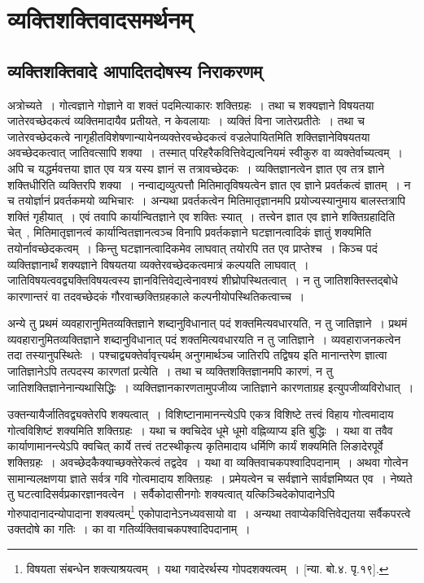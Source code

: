 	\section{व्यक्तिशक्तिवादसमर्थनम्}

		\subsection{व्यक्तिशक्तिवादे आपादितदोषस्य निराकरणम् }

			\begin{small}
				अत्रोच्यते~। गोत्वज्ञाने गोज्ञाने वा शक्तं पदमित्याकारः शक्तिग्रहः~। तथा च शक्यज्ञाने विषयतया जातेरवच्छेदकत्वं व्यक्तिमादायैव प्रतीयते, न केवलायाः~। व्यक्तिं विना जातेरप्रतीतेः~। तथा च जातेरवच्छेदकत्वे नागृहीतविशेषणान्यायेनव्यक्तेरवच्छेदकत्वं वज्रलेपायितमिति शक्तिज्ञानेविषयतया अवच्छेदकत्वात् जातिवत्सापि शक्या~। तस्मात् परिहरैकवित्तिवेद्यत्वनियमं स्वीकुरु वा व्यक्तेर्वाच्यत्वम्~। अपि च यद्धर्मवत्तया ज्ञात एव यत्र यस्य ज्ञानं स तत्रावच्छेदकः~। व्यक्तिज्ञानत्वेन ज्ञात एव तत्र ज्ञाने शक्तिधीरिति व्यक्तिरपि शक्या~। नन्वाद्यव्युत्पत्तौ मितिमातृविषयत्वेन ज्ञात एव ज्ञाने प्रवर्तकत्वं ज्ञातम्~। न च तयोर्ज्ञानं प्रवर्तकमयो व्यभिचारः~। अन्यथा प्रवर्तकत्वेन मितिमातृज्ञानमपि प्रयोज्यस्यानुमाय बालस्तत्रापि शक्तिं गृहीयात्~। एवं तवापि कार्यान्वितज्ञाने एव शक्तिः स्यात्~। तत्त्वेन ज्ञात एव ज्ञाने शक्तिग्रहादिति चेत्~, मितिमातृज्ञानत्वं कार्यान्वितज्ञानत्वञ्च विनापि प्रवर्तकज्ञाने घटज्ञानत्वादिकं ज्ञातुं शक्यमिति तयोर्नावच्छेदकत्वम्~। किन्तु घटज्ञानत्वादिकमेव लाघवात् तयोरपि तत एव प्राप्तेश्च~। किञ्च पदं व्यक्तिज्ञानार्थं शक्यज्ञाने विषयतया व्यक्तेरवच्छेदकत्वमात्रं कल्पयति लाघवात्~। जातिविषयत्ववद्व्यक्तिविषयत्वस्य ज्ञानवित्तिवेद्यत्वेनावश्यं शीघ्रोपस्थितत्वात्~। न तु जातिशक्तिस्तद्बोधे कारणान्तरं वा तदवच्छेदकं गौरवाच्छक्तिग्रहकाले कल्पनीयोपस्थितिकत्वाच्च~।
	
				अन्ये तु प्रथमं व्यवहारानुमितव्यक्तिज्ञाने शब्दानुविधानात् पदं शक्तमित्यवधारयति, न तु जातिज्ञाने~। प्रथमं व्यवहारानुमितव्यक्तिज्ञाने शब्दानुविधानात् पदं शक्तमित्यवधारयति न तु जातिज्ञाने~। व्यवहाराजनकत्वेन तदा तस्यानुपस्थितेः~। पश्चाद्व्यक्तेर्वावृत्त्यर्थम् अनुगमार्थञ्च जातिरपि तद्विषय इति मानान्तरेण ज्ञात्वा जातिज्ञानेऽपि तत्पदस्य कारणतां प्रत्येति~। तथा च व्यक्तिशक्तिज्ञानमपि कारणं, न तु जातिशक्तिज्ञानेनान्यथासिद्धिः~। व्यक्तिज्ञानकारणतामुपजीव्य जातिज्ञाने कारणताग्रह इत्युपजीव्यविरोधात्~। 

		
				उक्तन्यायैर्जातिवद्व्यक्तेरपि शक्यत्वात्~। विशिष्टानामानन्त्येऽपि एकत्र विशिष्टे तत्त्वं विहाय गोत्वमादाय गोत्वविशिष्टं शक्यमिति शक्तिग्रहः~। यथा च क्वचिदेव धूमे धूमो वह्निव्याप्य इति बुद्धिः~। यथा वा तवैव कार्याणामानन्त्येऽपि क्वचित् कार्ये तत्त्वं तटस्थीकृत्य कृतिमादाय धर्मिणि कार्यं शक्यमिति लिङादेरपूर्वे शक्तिग्रहः~। अवच्छेदकैक्याच्छक्तेरेकत्वं तद्वदेव~। यथा वा व्यक्तिवाचकपश्वादिपदानाम्~। अथवा गोत्वेन सामान्यलक्षणया ज्ञाते सर्वत्र गवि गोत्वमादाय शक्तिग्रहः~। प्रमेयत्वेन च सर्वज्ञाने सार्वज्ञमिष्यत एव~। नेष्यते तु घटत्वादिसर्वप्रकारज्ञानवत्वेन~। सर्वैकोदासीनगोः शक्यत्वात् यत्किञ्चिदेकोपादानेऽपि गोरुपादानादन्योपादाना शक्यत्वम्\footnote{विषयता संबन्धेन शक्त्याश्रयत्वम्~। यथा गवादेरर्थस्य गोपदशक्यत्वम्~। [न्या. बो.४. पृ.१९].} एकोपादानेऽनध्यवसायो वा~। अन्यथा तवाप्येकवित्तिवेद्यतया सर्वैकपरत्वे उक्तदोषे का गतिः~। का वा गतिर्व्यक्तिवाचकपश्वादिपदानाम्~। 
			\end{small}


